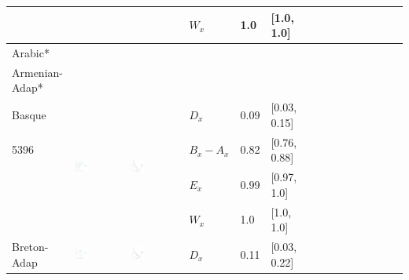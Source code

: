 \documentclass[11pt,letterpaper]{article}
\begin{document}
\begin{longtable}{lllllllllllllll}
  &    &    &  $W_x$  &  1.0  &  [1.0, 1.0]  \\ [10.25ex] \hline
Arabic*  &\\ [10.25ex] \hline
Armenian-Adap*  &\\ [10.25ex] \hline
Basque  &  \multirow{4}{*}{\includegraphics[width=0.25\textwidth]{figures/Basque-entropy-memory.pdf}}  &  \multirow{4}{*}{\includegraphics[width=0.25\textwidth]{figures/Basque-listener-surprisal-memory.pdf}}  &  $D_x$  &  0.09  &  [0.03, 0.15]  \\ 
5396  &    &    &  $B_x-A_x$  &  0.82  &  [0.76, 0.88]  \\ 
  &    &    &  $E_x$  &  0.99  &  [0.97, 1.0]  \\ 
  &    &    &  $W_x$  &  1.0  &  [1.0, 1.0]  \\ [10.25ex] \hline
Breton-Adap  &  \multirow{4}{*}{\includegraphics[width=0.25\textwidth]{figures/Breton-Adap-entropy-memory.pdf}}  &  \multirow{4}{*}{\includegraphics[width=0.25\textwidth]{figures/Breton-Adap-listener-surprisal-memory.pdf}}  &  $D_x$  &  0.11  &  [0.03, 0.22]  \\ 

\end{longtable}
\end{document}
